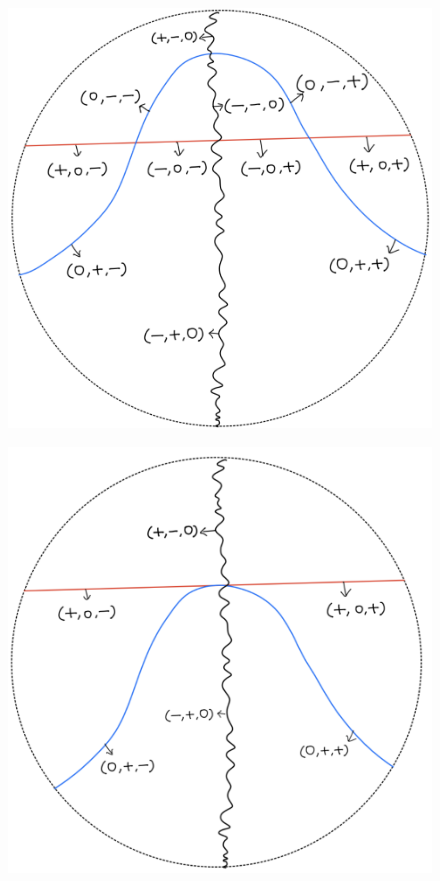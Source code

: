 \begin{definition}
\begin{enumerate}
\begin{itemize}
\begin{figure}[H]
    \centering
    \includegraphics[scale = 0.45]{diagrams/lemma3/10.png} 
    \caption{}
    \label{fig:your-label}
\end{figure}
\begin{figure}[H]
    \centering
    \includegraphics[scale = 0.45]{diagrams/lemma3/11.png} 

\end{figure}
\end{itemize}
\end{enumerate}
\end{definition}
